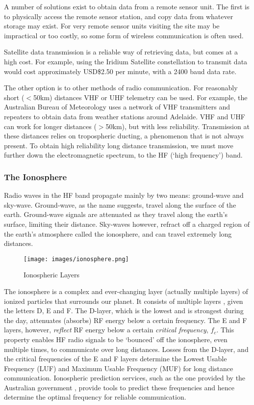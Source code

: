 \documentclass[a4paper,12pt]{article}
\begin{document}
A number of solutions exist to obtain data from a remote sensor unit. The first is to physically access the remote sensor station, and copy data from whatever storage may exist. For very remote sensor units visiting the site may be impractical or too costly, so some form of wireless communication is often used. 

Satellite data transmission is a reliable way of retrieving data, but comes at a high cost. For example, using the Iridium Satellite constellation to transmit data would cost approximately USD\$2.50 per minute, with a 2400 baud data rate\citep{ref:iridium}.

The other option is to other methods of radio communication. For reasonably short ($<$50km) distances VHF or UHF telemetry can be used. For example, the Australian Bureau of Meteorology uses a network of VHF transmitters\citep{ref:bomtx} and repeaters to obtain data from weather stations around Adelaide. VHF and UHF can work for longer distances ($>$50km), but with less reliability. Transmission at these distances relies on tropospheric ducting, a phenomenon that is not always present. To obtain high reliability long distance transmission, we must move further down the electromagnetic spectrum, to the HF (`high frequency') band.

\subsubsection*{The Ionosphere}

Radio waves in the HF band propagate mainly by two means: ground-wave and sky-wave. Ground-wave, as the name suggests, travel along the surface of the earth. Ground-wave signals are attenuated as they travel along the earth's surface, limiting their distance. Sky-waves however, refract off a charged region of the earth's atmosphere called the ionosphere, and can travel extremely long distances.

\begin{figure}[h]
  \begin{center}
    \texttt{[image: images/ionosphere.png]}
  \end{center}
  \caption{Ionospheric Layers}
  \label{fig:ionosphere}
\end{figure}

The ionosphere is a complex and ever-changing layer (actually multiple layers) of ionized particles that surrounds our planet. It consists of multiple layers , given the letters D, E and F. The D-layer, which is the lowest and is strongest during the day, attenuates (absorbs) RF energy below a certain frequency. The E and F layers, however, \textit{reflect} RF energy below a certain \textit{critical frequency}, $f_c$. This property enables HF radio signals to be `bounced' off the ionosphere, even multiple times, to communicate over long distances. Losses from the D-layer, and the critical frequencies of the E and F layers determine the Lowest Usable Frequency (LUF) and Maximum Usable Frequency (MUF) for long distance communication. Ionospheric prediction services, such as the one provided by the Australian government \citep{ref:bom}, provide tools to predict these frequencies and hence determine the optimal frequency for reliable communication.
\end{document}
